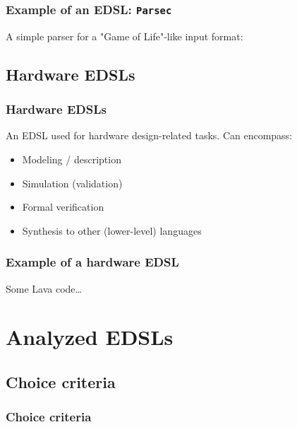\documentclass{beamer}
\begin{document}
            \begin{frame}[fragile]
                \frametitle{Example of an EDSL: \texttt{Parsec}}

                A simple parser for a "Game of Life"-like input format:
\end{frame}


        \subsection{Hardware EDSLs}
        \label{subsec:hardware-edsls}
            \begin{frame}
                \frametitle{Hardware EDSLs}
                An EDSL used for hardware design-related tasks. Can encompass:

                \begin{itemize}
                    \item Modeling / description
                    \item Simulation (validation)
                    \item Formal verification
                    \item Synthesis to other (lower-level) languages
                \end{itemize}
            \end{frame}

            \begin{frame}
                \frametitle{Example of a hardware EDSL}

                Some Lava code\ldots
            \end{frame}



    \section{Analyzed EDSLs}
    \label{sec:analyzed-edsls}
        \frame{\sectionpage}

        \subsection{Choice criteria}
        \label{subsec:edsls-choice-criteria}
            \begin{frame}
                \frametitle{Choice criteria}
            \end{frame}
\end{document}
